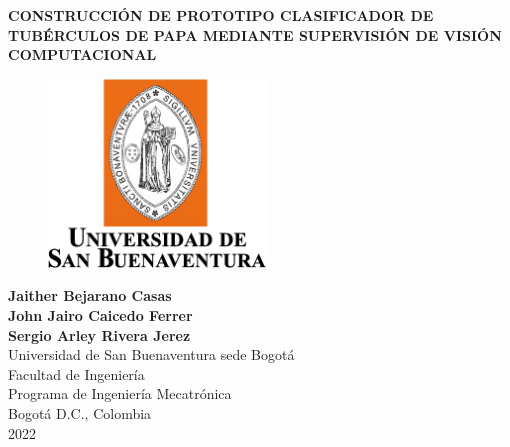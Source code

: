 \cleardoublepage

\thispagestyle{empty} 
\begin{center}
\textbf{ 
\huge{CONSTRUCCIÓN DE PROTOTIPO CLASIFICADOR DE TUBÉRCULOS DE PAPA MEDIANTE SUPERVISIÓN DE VISIÓN COMPUTACIONAL}}\\[0.8.0cm]


\begin{figure}[htbp]
	\centering
		\includegraphics[height=5cm,keepaspectratio]{OtrosTex/LogoUSB}
\end{figure}

\vspace*{2cm} 
\Large\textbf{Jaither Bejarano Casas \\ John Jairo Caicedo Ferrer \\Sergio Arley Rivera Jerez}\\[1.0cm]

\vspace*{1.2cm} 
\Large{Universidad de San Buenaventura sede Bogotá}\\
\Large{Facultad de Ingeniería}\\
\Large{Programa de Ingeniería Mecatrónica}\\
\large{Bogotá D.C., Colombia\\
2022}\\
\end{center}

\newpage{\pagestyle{empty}\cleardoublepage}
\newpage
%
